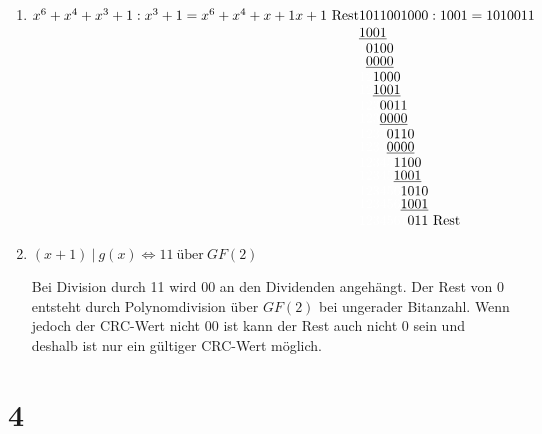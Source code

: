 \documentclass[ngerman]{scrartcl}
\begin{document}
\begin{enumerate}[label=\alph*)]
  \item
  \(
    x^6 + x^4 + x^3 + 1 : x^3 + 1 = x^6 + x^4 + x + 1
    \\
    x + 1\ \text{Rest}
    \\
    \\
    \stackMath\def\stackalignment{l}
    \stackunder{%
      1011001000 : 1001 = 1010011
    }{%
      \Shortstack[l]{
        {     \underline{1001}}
        {\textcolor{white}{1}           0100}
        {\textcolor{white}{1}\underline{0000}}
        {\textcolor{white}{12}           1000}
        {\textcolor{white}{12}\underline{1001}}
        {\textcolor{white}{123}           0011}
        {\textcolor{white}{123}\underline{0000}}
        {\textcolor{white}{1234}           0110}
        {\textcolor{white}{1234}\underline{0000}}
        {\textcolor{white}{12345}           1100}
        {\textcolor{white}{12345}\underline{1001}}
        {\textcolor{white}{123456}           1010}
        {\textcolor{white}{123456}\underline{1001}}
        {\textcolor{white}{1234567}           011\ \text{Rest}}
      }
    }
  \)

  \addtocounter{enumi}{3}
  \item
  $(x + 1)\ |\ g(x) \Leftrightarrow 11\ \text{über}\ GF(2)$

  Bei Division durch 11 wird $00$ an den Dividenden angehängt. Der Rest von $0$ entsteht
  durch Polynomdivision über $GF(2)$ bei ungerader Bitanzahl. Wenn jedoch der CRC-Wert
  nicht 00 ist kann der Rest auch nicht 0 sein und deshalb ist nur ein gültiger CRC-Wert
  möglich.
\end{enumerate}


\section*{4}
\end{document}
